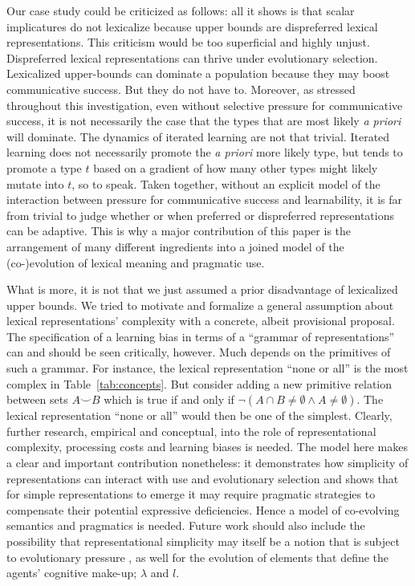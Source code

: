 \documentclass[a4paper, 11pt]{article}
\theoremstyle{Satz}
\begin{document}
Our case study could be criticized as follows: all it shows is that scalar implicatures do not
lexicalize because upper bounds are dispreferred lexical representations. This criticism would be too
superficial and highly unjust. Dispreferred lexical representations can thrive under evolutionary
selection. Lexicalized upper-bounds can dominate a population because they may boost
communicative success. But they do not have to. Moreover, as stressed throughout this investigation, even without selective pressure
for communicative success, it is not necessarily the case that the types that are most
likely \emph{a priori} will dominate. The dynamics of iterated learning are not that
trivial. Iterated learning does not necessarily promote the \emph{a priori} more likely type,
but tends to promote a type $t$ based on a gradient of how many other types might likely mutate
into $t$, so to speak. Taken together, without an explicit model of the interaction between
pressure for communicative success and learnability, it is far from trivial to judge whether or when
preferred or dispreferred representations can be adaptive. This is why a major contribution of this
paper is the arrangement of many different ingredients into a joined model of the (co-)evolution
of lexical meaning and pragmatic use. 

What is more, it is not that we just assumed a prior disadvantage of lexicalized upper
bounds. We tried to motivate and formalize a general assumption about lexical representations'
complexity with a concrete, albeit provisional proposal. The specification of a learning bias
in terms of a ``grammar of representations'' can and should be seen critically, however. Much
depends on the primitives of such a grammar. For instance, the lexical representation ``none or
all'' is the most complex in Table~\ref{tab:concepts}. But consider adding a new primitive
relation between sets $A \smile B$ which is true if and only if
$\neg(A \cap B \neq \emptyset \wedge A \neq \emptyset)$. The lexical representation ``none or
all'' would then be one of the simplest. Clearly, further research, empirical and conceptual,
into the role of representational complexity, processing costs and learning biases is
needed. The model here makes a clear and important contribution nonetheless: it demonstrates
how simplicity of representations can interact with use and evolutionary selection and shows
that for simple representations to emerge it may require pragmatic strategies to compensate
their potential expressive deficiencies. Hence a model of co-evolving semantics and pragmatics is
needed. Future work should also include the possibility that representational simplicity may
itself be a notion that is subject to evolutionary pressure
\citep[cf.][]{ThompsonKirby2016:Culture-Shapes-}, as well for the evolution of elements that define
the agents' cognitive make-up; $\lambda$ and $l$.
\end{document}
